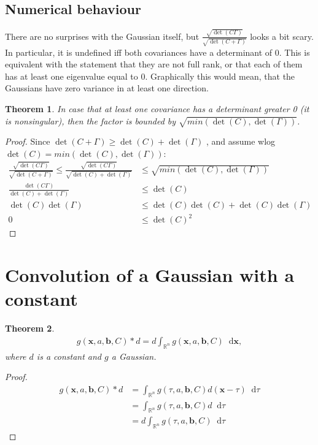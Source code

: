 \documentclass{paper}
\newtheorem{theorem}{Theorem}
\newcommand{\vr}[1]{\ensuremath{\boldsymbol{#1}}}
\newcommand{\f}[1]{#1}
\newcommand*\diff{\mathop{}\!\mathrm{d}}
\newcommand{\bvec}[0]{\ensuremath{\vr{b}}}
\newcommand{\xvec}[0]{\ensuremath{\vr{x}}}
\begin{document}
\subsection{Numerical behaviour}
There are no surprises with the Gaussian itself, but $\frac{\sqrt{\det(C\Gamma)}}{\sqrt{\det(C+\Gamma)}}$ looks a bit scary.
In particular, it is undefined iff both covariances have a determinant of 0.
This is equivalent with the statement that they are not full rank, or that each of them has at least one eigenvalue equal to 0.
Graphically this would mean, that the Gaussians have zero variance in at least one direction.

\begin{theorem}
	In case that at least one covariance has a determinant greater 0 (it is nonsingular), then the factor is bounded by $\sqrt{\f{min}(\det(C), \det(\Gamma))}$.
\end{theorem}
\begin{proof}
Since $\det(C+\Gamma) \ge \det(C) + \det(\Gamma)$ \citep{wiki_det_inequalities}, and assume wlog $\det(C) = \f{min}(\det(C), \det(\Gamma))$:
\begin{align*}
	\frac{\sqrt{\det(C\Gamma)}}{\sqrt{\det(C+\Gamma)}} \le \frac{\sqrt{\det(C\Gamma)}}{\sqrt{\det(C) + \det(\Gamma)}} &\le \sqrt{\f{min}(\det(C), \det(\Gamma))} \\
	\frac{\det(C\Gamma)}{\det(C) + \det(\Gamma)} &\le \det(C) \\
	\det(C)\det(\Gamma) &\le \det(C)\det(C) + \det(C)\det(\Gamma) \\
	0 &\le \det(C)^2
\end{align*}
\end{proof}

\section{Convolution of a Gaussian with a constant}
\begin{theorem}
	\begin{align}
		g(\xvec, a, \bvec, C) \ast d = d \int_{\mathbb{R}^n} g(\xvec, a, \bvec, C) \diff \xvec,
	\end{align}
	where $d$ is a constant and $g$ a Gaussian. 
\end{theorem}
\begin{proof}
	\begin{align}
		g(\xvec, a, \bvec, C) \ast d &= \int_{\mathbb{R}^n} g(\tau, a, \bvec, C) d(\xvec - \tau) \diff \tau\\
		&= \int_{\mathbb{R}^n} g(\tau, a, \bvec, C) d \diff \tau\\
		&= d \int_{\mathbb{R}^n} g(\tau, a, \bvec, C) \diff \tau
	\end{align}
\end{proof}
\end{document}
